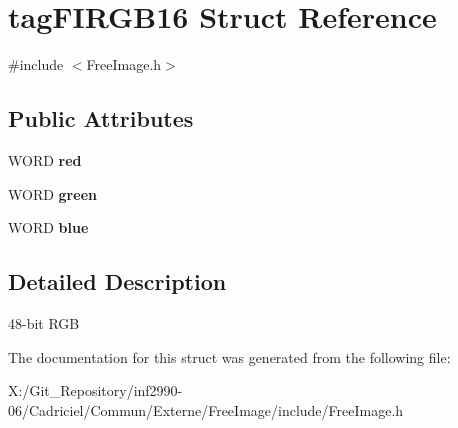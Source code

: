 \hypertarget{structtag_f_i_r_g_b16}{\section{tag\-F\-I\-R\-G\-B16 Struct Reference}
\label{structtag_f_i_r_g_b16}
}


{\ttfamily \#include $<$Free\-Image.\-h$>$}

\subsection*{Public Attributes}
\begin{DoxyCompactItemize}
\item 
\hypertarget{structtag_f_i_r_g_b16_aeaa2393246d6482c02cac30d169ee022}{W\-O\-R\-D {\bfseries red}}\label{structtag_f_i_r_g_b16_aeaa2393246d6482c02cac30d169ee022}

\item 
\hypertarget{structtag_f_i_r_g_b16_a00e213246943f0a47698fdd0d51f9924}{W\-O\-R\-D {\bfseries green}}\label{structtag_f_i_r_g_b16_a00e213246943f0a47698fdd0d51f9924}

\item 
\hypertarget{structtag_f_i_r_g_b16_ae9de217a4d3c01c533bc8e727c0ec0eb}{W\-O\-R\-D {\bfseries blue}}\label{structtag_f_i_r_g_b16_ae9de217a4d3c01c533bc8e727c0ec0eb}

\end{DoxyCompactItemize}


\subsection{Detailed Description}
48-\/bit R\-G\-B 

The documentation for this struct was generated from the following file\-:\begin{DoxyCompactItemize}
\item 
X\-:/\-Git\-\_\-\-Repository/inf2990-\/06/\-Cadriciel/\-Commun/\-Externe/\-Free\-Image/include/Free\-Image.\-h\end{DoxyCompactItemize}
